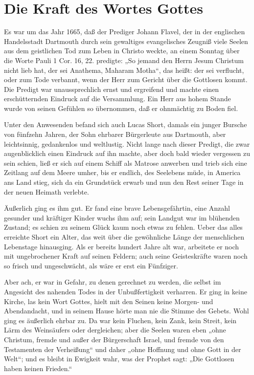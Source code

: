 \chapter[Die Kraft des Wortes Gottes]{Die Kraft des Wortes Gottes}
Es war um das Jahr 1665, daß der Prediger Johann Flavel, der in der englischen Handelsstadt Dartmouth durch sein gewaltiges evangelisches Zeugniß viele Seelen aus dem geistlichen Tod zum Leben in Christo weckte, an einem Sonntag über die Worte Pauli 1 Cor. 16, 22. predigte: „So jemand den Herrn Jesum Christum nicht lieb hat, der sei Anathema, Maharam Motha“, das heißt: der sei verflucht, oder zum Tode verbannt, wenn der Herr zum Gericht über die Gottlosen kommt. Die Predigt war unaussprechlich ernst und ergreifend und machte einen erschütternden Eindruck auf die Versammlung. Ein Herr aus hohem Stande wurde von seinen Gefühlen so übernommen, daß er ohnmächtig zu Boden fiel.

Unter den Anwesenden befand sich auch Lucas Short, damals ein junger Bursche von fünfzehn Jahren, der Sohn ehrbarer Bürgerleute aus Dartmouth, aber leichtsinnig, gedankenlos und weltlustig. Nicht lange nach dieser Predigt, die zwar augenblicklich einen Eindruck auf ihn machte, aber doch bald wieder vergessen zu sein schien, ließ er sich auf einem Schiff als Matrose anwerben und trieb sich eine Zeitlang auf dem Meere umher, bis er endlich, des Seelebens müde, in America ans Land stieg, sich da ein Grundstück erwarb und nun den Rest seiner Tage in der neuen Heimath verlebte.

Äußerlich ging es ihm gut. Er fand eine brave Lebensgefährtin, eine Anzahl gesunder und kräftiger Kinder wuchs ihm auf; sein Landgut war im blühenden Zustand; es schien zu seinem Glück kaum noch etwas zu fehlen. Ueber das alles erreichte Short ein Alter, das weit über die gewöhnliche Länge der menschlichen Lebenstage hinausging. Als er bereits hundert Jahre alt war, arbeitete er noch mit ungebrochener Kraft auf seinen Feldern; auch seine Geisteskräfte waren noch so frisch und ungeschwächt, als wäre er erst ein Fünfziger.

Aber ach, er war in Gefahr, zu denen gerechnet zu werden, die selbst im Angesicht des nahenden Todes in der Unbußfertigkeit verharren. Er ging in keine Kirche, las kein Wort Gottes, hielt mit den Seinen keine Morgen- und Abendandacht, und in seinem Hause hörte man nie die Stimme des Gebets. Wohl ging es äußerlich ehrbar zu. Da war kein Fluchen, kein Zank, kein Streit, kein Lärm des Weinsäufers oder dergleichen; aber die Seelen waren eben „ohne Christum, fremde und außer der Bürgerschaft Israel, und fremde von den Testamenten der Verheißung“ und daher „ohne Hoffnung und ohne Gott in der Welt“; und es bleibt in Ewigkeit wahr, was der Prophet sagt: „Die Gottlosen haben keinen Frieden.“

